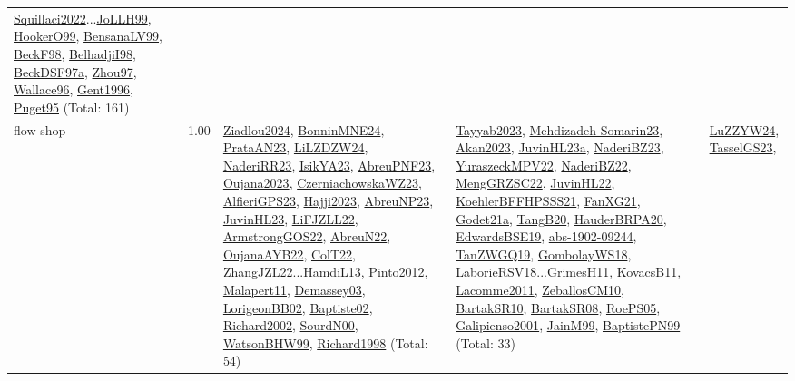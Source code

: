 {\begin{longtable}{p{3cm}r>{\raggedright\arraybackslash}p{6cm}>{\raggedright\arraybackslash}p{6cm}>{\raggedright\arraybackslash}p{8cm}}
\hyperref[detail:Squillaci2022]{Squillaci2022}...\hyperref[detail:JoLLH99]{JoLLH99}, \hyperref[detail:HookerO99]{HookerO99}, \hyperref[detail:BensanaLV99]{BensanaLV99}, \hyperref[detail:BeckF98]{BeckF98}, \hyperref[detail:BelhadjiI98]{BelhadjiI98}, \hyperref[detail:BeckDSF97a]{BeckDSF97a}, \hyperref[detail:Zhou97]{Zhou97}, \hyperref[detail:Wallace96]{Wallace96}, \hyperref[detail:Gent1996]{Gent1996}, \hyperref[detail:Puget95]{Puget95} (Total: 161)\\
\index{flow-shop}\index{Concepts!flow-shop}flow-shop &  1.00 & \hyperref[detail:Ziadlou2024]{Ziadlou2024}, \hyperref[detail:BonninMNE24]{BonninMNE24}, \hyperref[detail:PrataAN23]{PrataAN23}, \hyperref[detail:LiLZDZW24]{LiLZDZW24}, \hyperref[detail:NaderiRR23]{NaderiRR23}, \hyperref[detail:IsikYA23]{IsikYA23}, \hyperref[detail:AbreuPNF23]{AbreuPNF23}, \hyperref[detail:Oujana2023]{Oujana2023}, \hyperref[detail:CzerniachowskaWZ23]{CzerniachowskaWZ23}, \hyperref[detail:AlfieriGPS23]{AlfieriGPS23}, \hyperref[detail:Hajji2023]{Hajji2023}, \hyperref[detail:AbreuNP23]{AbreuNP23}, \hyperref[detail:JuvinHL23]{JuvinHL23}, \hyperref[detail:LiFJZLL22]{LiFJZLL22}, \hyperref[detail:ArmstrongGOS22]{ArmstrongGOS22}, \hyperref[detail:AbreuN22]{AbreuN22}, \hyperref[detail:OujanaAYB22]{OujanaAYB22}, \hyperref[detail:ColT22]{ColT22}, \hyperref[detail:ZhangJZL22]{ZhangJZL22}...\hyperref[detail:HamdiL13]{HamdiL13}, \hyperref[detail:Pinto2012]{Pinto2012}, \hyperref[detail:Malapert11]{Malapert11}, \hyperref[detail:Demassey03]{Demassey03}, \hyperref[detail:LorigeonBB02]{LorigeonBB02}, \hyperref[detail:Baptiste02]{Baptiste02}, \hyperref[detail:Richard2002]{Richard2002}, \hyperref[detail:SourdN00]{SourdN00}, \hyperref[detail:WatsonBHW99]{WatsonBHW99}, \hyperref[detail:Richard1998]{Richard1998} (Total: 54) & \hyperref[detail:Tayyab2023]{Tayyab2023}, \hyperref[detail:Mehdizadeh-Somarin23]{Mehdizadeh-Somarin23}, \hyperref[detail:Akan2023]{Akan2023}, \hyperref[detail:JuvinHL23a]{JuvinHL23a}, \hyperref[detail:NaderiBZ23]{NaderiBZ23}, \hyperref[detail:YuraszeckMPV22]{YuraszeckMPV22}, \hyperref[detail:NaderiBZ22]{NaderiBZ22}, \hyperref[detail:MengGRZSC22]{MengGRZSC22}, \hyperref[detail:JuvinHL22]{JuvinHL22}, \hyperref[detail:KoehlerBFFHPSSS21]{KoehlerBFFHPSSS21}, \hyperref[detail:FanXG21]{FanXG21}, \hyperref[detail:Godet21a]{Godet21a}, \hyperref[detail:TangB20]{TangB20}, \hyperref[detail:HauderBRPA20]{HauderBRPA20}, \hyperref[detail:EdwardsBSE19]{EdwardsBSE19}, \hyperref[detail:abs-1902-09244]{abs-1902-09244}, \hyperref[detail:TanZWGQ19]{TanZWGQ19}, \hyperref[detail:GombolayWS18]{GombolayWS18}, \hyperref[detail:LaborieRSV18]{LaborieRSV18}...\hyperref[detail:GrimesH11]{GrimesH11}, \hyperref[detail:KovacsB11]{KovacsB11}, \hyperref[detail:Lacomme2011]{Lacomme2011}, \hyperref[detail:ZeballosCM10]{ZeballosCM10}, \hyperref[detail:BartakSR10]{BartakSR10}, \hyperref[detail:BartakSR08]{BartakSR08}, \hyperref[detail:RoePS05]{RoePS05}, \hyperref[detail:Galipienso2001]{Galipienso2001}, \hyperref[detail:JainM99]{JainM99}, \hyperref[detail:BaptistePN99]{BaptistePN99} (Total: 33) & \hyperref[detail:LuZZYW24]{LuZZYW24}, \hyperref[detail:TasselGS23]{TasselGS23}, 
\end{longtable}}

